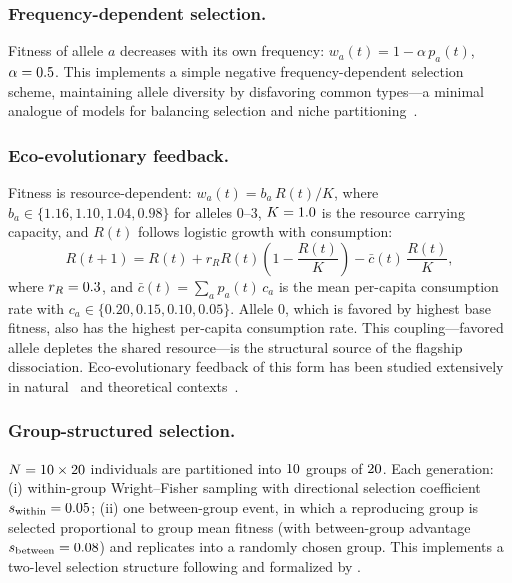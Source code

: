 \documentclass[11pt,a4paper]{article}
\begin{document}
\subsubsection{Frequency-dependent selection.}
Fitness of allele $a$ decreases with its own frequency:
$w_a(t) = 1 - \alpha\,p_a(t)$, $\alpha = 0.5$.
This implements a simple negative frequency-dependent selection scheme,
maintaining allele diversity by disfavoring common types---a minimal
analogue of models for balancing selection and
niche partitioning~\citep{Ayala1974, Charlesworth2006, Delph2016}.

\subsubsection{Eco-evolutionary feedback.}
Fitness is resource-dependent:
$w_a(t) = b_a\,R(t)/K$,
where $b_a \in \{1.16, 1.10, 1.04, 0.98\}$ for alleles $0$--$3$,
$K = 1.0$ is the resource carrying capacity, and $R(t)$ follows
logistic growth with consumption:
\begin{equation}
  R(t+1) = R(t) + r_R R(t)\!\left(1 - \frac{R(t)}{K}\right)
              - \bar{c}(t)\,\frac{R(t)}{K},
  \label{eq:eco}
\end{equation}
where $r_R = 0.3$, and $\bar{c}(t) = \sum_a p_a(t)\,c_a$ is the
mean per-capita consumption rate with
$c_a \in \{0.20, 0.15, 0.10, 0.05\}$.
Allele 0, which is favored by highest base fitness, also has the highest
per-capita consumption rate.
This coupling---favored allele depletes the shared resource---is the structural
source of the flagship dissociation.
Eco-evolutionary feedback of this form has been studied extensively
in natural~\citep{Yoshida2003, Hairston2005, Schoener2011} and theoretical
contexts~\citep{Post2009, Ellner2011, Hendry2016}.

\subsubsection{Group-structured selection.}
$N = 10 \times 20$ individuals are partitioned into
$10$ groups of $20$.
Each generation: (i) within-group Wright--Fisher sampling with directional
selection coefficient $s_\mathrm{within} = 0.05$;
(ii) one between-group event, in which a reproducing group is selected
proportional to group mean fitness (with between-group advantage
$s_\mathrm{between} = 0.08$) and replicates into a randomly chosen group.
This implements a two-level selection structure following
\citet{Wilson1975} and formalized by \citet{Price1970}.
\end{document}
